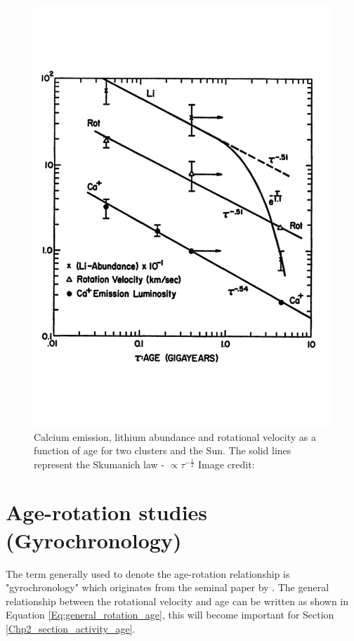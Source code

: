 \begin{figure}
    \centering
    \includegraphics[scale=0.45]{Figures/2-Historical_overview/skumanich_1972.pdf}
    \caption[First plot of age-activity-rotation relationship]{Calcium emission, lithium abundance and rotational velocity as a function of age for two clusters and the Sun. The solid lines represent the Skumanich law - $\propto \tau^{-\frac{1}{2}}$ Image credit: \citet{Skumanich_1972}}
    \label{fig:Skumanich_plot}
\end{figure}

\section{Age-rotation studies (Gyrochronology)}
The term generally used to denote the age-rotation relationship is "gyrochronology" which originates from the seminal paper by \citet{Barnes_2003}. The general relationship between the rotational velocity and age can be written as shown in Equation \ref{Eq:general_rotation_age}, this will become important for Section \ref{Chp2_section_activity_age}.

